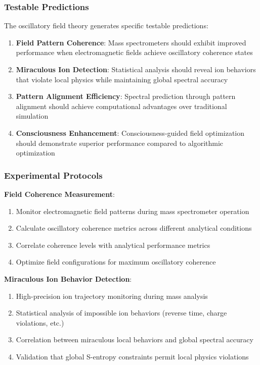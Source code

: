 \documentclass[11pt,a4paper]{article}
\theoremstyle{remark}
\begin{document}
\subsubsection{Testable Predictions}

The oscillatory field theory generates specific testable predictions:

\begin{enumerate}
\item \textbf{Field Pattern Coherence}: Mass spectrometers should exhibit improved performance when electromagnetic fields achieve oscillatory coherence states
\item \textbf{Miraculous Ion Detection}: Statistical analysis should reveal ion behaviors that violate local physics while maintaining global spectral accuracy
\item \textbf{Pattern Alignment Efficiency}: Spectral prediction through pattern alignment should achieve computational advantages over traditional simulation
\item \textbf{Consciousness Enhancement}: Consciousness-guided field optimization should demonstrate superior performance compared to algorithmic optimization
\end{enumerate}

\subsubsection{Experimental Protocols}

\textbf{Field Coherence Measurement}:
\begin{enumerate}
\item Monitor electromagnetic field patterns during mass spectrometer operation
\item Calculate oscillatory coherence metrics across different analytical conditions
\item Correlate coherence levels with analytical performance metrics
\item Optimize field configurations for maximum oscillatory coherence
\end{enumerate}

\textbf{Miraculous Ion Behavior Detection}:
\begin{enumerate}
\item High-precision ion trajectory monitoring during mass analysis
\item Statistical analysis of impossible ion behaviors (reverse time, charge violations, etc.)
\item Correlation between miraculous local behaviors and global spectral accuracy
\item Validation that global S-entropy constraints permit local physics violations
\end{enumerate}
\end{document}
